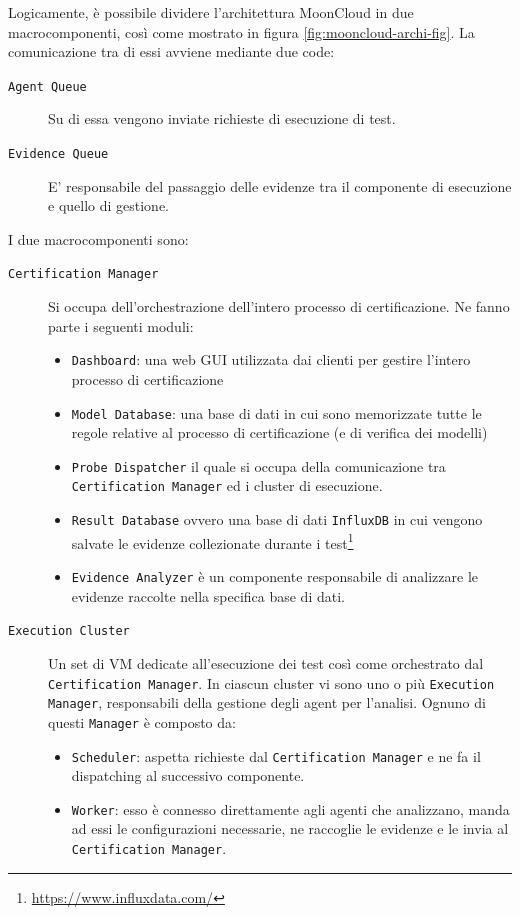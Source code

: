 Logicamente, è possibile dividere l'architettura MoonCloud
in due macrocomponenti, così come mostrato in figura \ref{fig:mooncloud-archi-fig}.
La comunicazione tra di essi avviene mediante due code:
\begin{description}
	\item[\texttt{Agent Queue}]Su di essa vengono inviate richieste di esecuzione di test.
	\item[\texttt{Evidence Queue}]E' responsabile del passaggio delle evidenze tra
	il componente di esecuzione e quello di gestione. 
\end{description}
I due macrocomponenti sono:
\begin{description}
	\item[\texttt{Certification Manager}]Si occupa dell'orchestrazione
	dell'intero processo di certificazione. Ne fanno parte i seguenti moduli:
	\begin{itemize}
		\item \texttt{Dashboard}: una web GUI utilizzata dai clienti per
		      gestire l'intero processo di certificazione
		\item \texttt{Model Database}: una base di dati in cui sono memorizzate
		      tutte le regole relative al processo di certificazione (e di verifica
		      dei modelli)
		\item \texttt{Probe Dispatcher} il quale si occupa della comunicazione
		      tra \texttt{Certification Manager} ed i cluster di esecuzione.
		\item \texttt{Result Database} ovvero una base di dati
		\texttt{InfluxDB} in
		      cui vengono salvate le evidenze collezionate durante i test\footnote{\url{https://www.influxdata.com/}}
		\item \texttt{Evidence Analyzer} è un componente responsabile di analizzare
		      le evidenze raccolte nella specifica base di dati. %
	\end{itemize}
	\item[\texttt{Execution Cluster}]Un set di VM dedicate all'esecuzione dei
	test così come orchestrato dal \texttt{Certification Manager}. In ciascun
	cluster vi sono uno o più \texttt{Execution Manager}, responsabili
	della gestione degli agent per l'analisi. Ognuno di questi \texttt{Manager}
	è composto da:
	\begin{itemize}
		\item \texttt{Scheduler}: aspetta richieste dal \texttt{Certification Manager}
		      e ne fa il dispatching al successivo componente.    
		\item \texttt{Worker}: esso è connesso direttamente agli agenti che analizzano,
		      manda ad essi le configurazioni necessarie, ne raccoglie le evidenze e le invia
		      al \texttt{Certification Manager}.
	\end{itemize}
\end{description}

